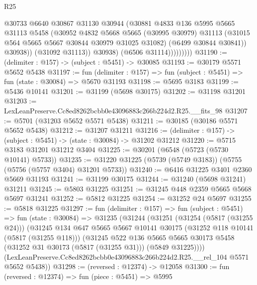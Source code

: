 \begin{lexlean}{R25}
\begin{coremodule}
                          @30733
                          @6640
                          @30867
                          @31130
                          @30944
                          (@30881
                            @4833
                            @136
                            @5995
                            @5665
                            @31113
                            @5458
                            (@30952
                              @4832
                              @5668
                              @5665
                              (@30995 @30979)
                              @31113
                              (@31015 @564 @5665 @5667 @30844 @30979 @31025 @31082)
                              (@6499 @30844 @30841))
                            @30938))
                        (@31092 @31113))
                      @30938)
                    (@6506 @31114)))))))))
@31190 := (delimiter : @157) -> (subject : @5451) -> @30085
@31193 := @30179 @5571 @5652 @5438
@31197 := fun (delimiter : @157) => fun (subject : @5451) => fun (state : @30084) => @5670 @31193
@31198 := @5695 @3183
@31199 := @5436 @10141
@31201 := @31199 (@5698 @30175)
@31202 := @31198 @31201
@31203 := LexLeanPreserve.Cc8ed8262bcbb0e43096883c266b224d2.R25.__fits_98
@31207 := @5701 (@31203 @5652 @5571 @5438)
@31211 := @30185 (@30186 @5571 @5652 @5438)
@31212 := @31207 @31211
@31216 := (delimiter : @157) -> (subject : @5451) -> (state : @30084) -> @31202 @31212
@31220 := @5715 @3183 @31201 @31212 @3404
@31225 := @30201 (@6548 (@5723 (@5730 @10141) @5733))
@31235 := @31220 @31225 (@5739 (@5749 @3183)) (@5755 (@5756 (@5757 @3404) @31201 @5733))
@31240 := @6416 @31225 @3401 @2360 @5669 @31193
@31241 := @31199 @30175
@31244 := @31240 (@5698 @31241) @31211
@31245 := @5803 @31225
@31251 := @31245 @448 @2359 @5665 @5668 @5697 @31241
@31252 := @5812 @31225
@31254 := @31252 @24 @5697
@31255 := @5818 @31225
@31297 := fun (delimiter : @157) =>
  fun (subject : @5451) =>
  fun (state : @30084) =>
  @31235
    (@31244
      (@31251
        (@31254 (@5817 (@31255 @24)))
        (@31245
          @134
          @647
          @5665
          @5667
          @10141
          @30175
          (@31252 @118 @10141 (@5817 (@31255 @118)))
          (@31245
            @522
            @136
            @5665
            @5665
            @30173
            @5458
            (@31252 @31 @30173 (@5817 (@31255 @31)))
            (@5849 @31225))))
      (LexLeanPreserve.Cc8ed8262bcbb0e43096883c266b224d2.R25.__rel_104 @5571 @5652 @5438))
@31298 := (reversed : @12374) -> @12058
@31300 := fun (reversed : @12374) => fun (piece : @5451) => @5995

\end{coremodule}
\end{lexlean}
